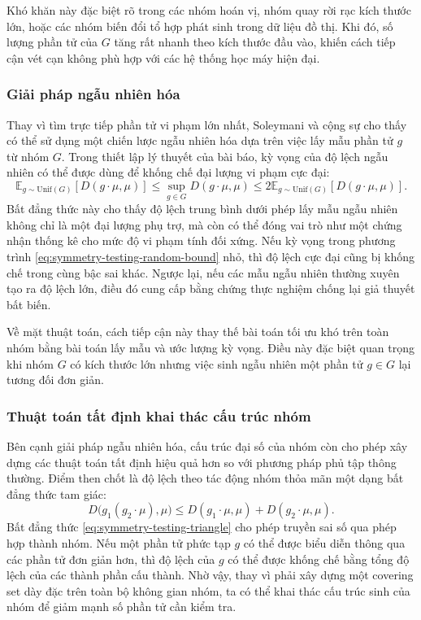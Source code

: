 Khó khăn này đặc biệt rõ trong các nhóm hoán vị, nhóm quay rời rạc kích thước lớn, hoặc các nhóm biến đổi tổ hợp phát sinh trong dữ liệu đồ thị. Khi đó, số lượng phần tử của $G$ tăng rất nhanh theo kích thước đầu vào, khiến cách tiếp cận vét cạn không phù hợp với các hệ thống học máy hiện đại.

\subsubsection{Giải pháp ngẫu nhiên hóa}

Thay vì tìm trực tiếp phần tử vi phạm lớn nhất, Soleymani và cộng sự cho thấy có thể sử dụng một chiến lược ngẫu nhiên hóa dựa trên việc lấy mẫu phần tử $g$ từ nhóm $G$. Trong thiết lập lý thuyết của bài báo, kỳ vọng của độ lệch ngẫu nhiên có thể được dùng để khống chế đại lượng vi phạm cực đại:
\begin{equation}
    \mathbb{E}_{g \sim \mathrm{Unif}(G)}
    \left[
        D(g \cdot \mu, \mu)
    \right]
    \leq
    \sup_{g \in G} D(g \cdot \mu, \mu)
    \leq
    2
    \mathbb{E}_{g \sim \mathrm{Unif}(G)}
    \left[
        D(g \cdot \mu, \mu)
    \right].
    \label{eq:symmetry-testing-random-bound}
\end{equation}
Bất đẳng thức này cho thấy độ lệch trung bình dưới phép lấy mẫu ngẫu nhiên không chỉ là một đại lượng phụ trợ, mà còn có thể đóng vai trò như một chứng nhận thống kê cho mức độ vi phạm tính đối xứng. Nếu kỳ vọng trong phương trình \eqref{eq:symmetry-testing-random-bound} nhỏ, thì độ lệch cực đại cũng bị khống chế trong cùng bậc sai khác. Ngược lại, nếu các mẫu ngẫu nhiên thường xuyên tạo ra độ lệch lớn, điều đó cung cấp bằng chứng thực nghiệm chống lại giả thuyết bất biến.

Về mặt thuật toán, cách tiếp cận này thay thế bài toán tối ưu khó trên toàn nhóm bằng bài toán lấy mẫu và ước lượng kỳ vọng. Điều này đặc biệt quan trọng khi nhóm $G$ có kích thước lớn nhưng việc sinh ngẫu nhiên một phần tử $g \in G$ lại tương đối đơn giản.

\subsubsection{Thuật toán tất định khai thác cấu trúc nhóm}

Bên cạnh giải pháp ngẫu nhiên hóa, cấu trúc đại số của nhóm còn cho phép xây dựng các thuật toán tất định hiệu quả hơn so với phương pháp phủ tập thông thường. Điểm then chốt là độ lệch theo tác động nhóm thỏa mãn một dạng bất đẳng thức tam giác:
\begin{equation}
    D\bigl(g_1(g_2 \cdot \mu), \mu\bigr)
    \leq
    D(g_1 \cdot \mu, \mu)
    +
    D(g_2 \cdot \mu, \mu).
    \label{eq:symmetry-testing-triangle}
\end{equation}
Bất đẳng thức \eqref{eq:symmetry-testing-triangle} cho phép truyền sai số qua phép hợp thành nhóm. Nếu một phần tử phức tạp $g$ có thể được biểu diễn thông qua các phần tử đơn giản hơn, thì độ lệch của $g$ có thể được khống chế bằng tổng độ lệch của các thành phần cấu thành. Nhờ vậy, thay vì phải xây dựng một covering set dày đặc trên toàn bộ không gian nhóm, ta có thể khai thác cấu trúc sinh của nhóm để giảm mạnh số phần tử cần kiểm tra.

